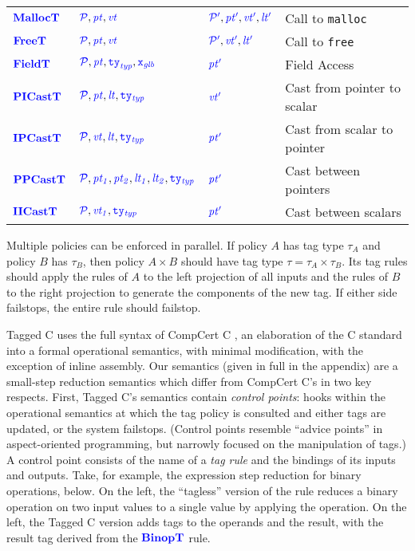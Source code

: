 \documentclass{llncs}
\begin{document}
\begin{table}[t]
\begin{tabular}{|l|l|l|l|}
    \(\malloctname\)    & \(\malloctargs\)       & \(\malloctres\)    & Call to {\tt malloc} \\
    \(\freetname\)      & \(\freetargs\)         & \(\freetres\)      & Call to {\tt free} \\
    \(\fieldtname\)     & \(\fieldtargs\)        & \(\fieldtres\)     & Field Access \\
    \(\picasttname\)    & \(\picasttargs\)       & \(\picasttres\)    & Cast from pointer to scalar \\
    \(\ipcasttname\)    & \(\ipcasttargs\)       & \(\ipcasttres\)    & Cast from scalar to pointer \\
    \(\ppcasttname\)    & \(\ppcasttargs\)       & \(\ppcasttres\)    & Cast between pointers \\
    \(\iicasttname\)    & \(\iicasttargs\)       & \(\iicasttres\)    & Cast between scalars \\
    \hline
  \end{tabular}

Multiple policies can be enforced in parallel. If policy \(A\) has tag type \(\tau_A\)
and policy \(B\) has \(\tau_B\), then policy \(A \times B\) should have tag type
\(\tau = \tau_A \times \tau_B\). Its tag rules should apply the rules of \(A\) to
the left projection of all inputs and the rules of \(B\) to the right projection
to generate the components of the new tag. If either side failstops, the entire
rule should failstop.

Tagged C uses the full syntax of CompCert C \cite{Leroy09:CompCert},
an elaboration of the C standard into a formal operational semantics,
with minimal modification, with the exception of inline assembly.
Our semantics (given in full in the appendix) are a small-step reduction
semantics which differ from CompCert C's in two key respects. First, Tagged C's semantics contain
{\em control points}: hooks within the
operational semantics at which the tag policy is consulted and either tags are updated, or the system
failstops. (Control points resemble ``advice points'' in aspect-oriented programming, but narrowly
focused on the manipulation of tags.) A control point consists of the name of a {\em tag rule}
and the bindings of its inputs and outputs. Take, for example, the expression step reduction
for binary operations, below. On the left, the ``tagless'' version of the rule reduces a
binary operation on two input values to a single value by applying the operation.
On the left, the Tagged C version adds tags to the operands and the result, with the result tag
derived from the \(\binoptname\) rule.


\end{table}
\end{document}
